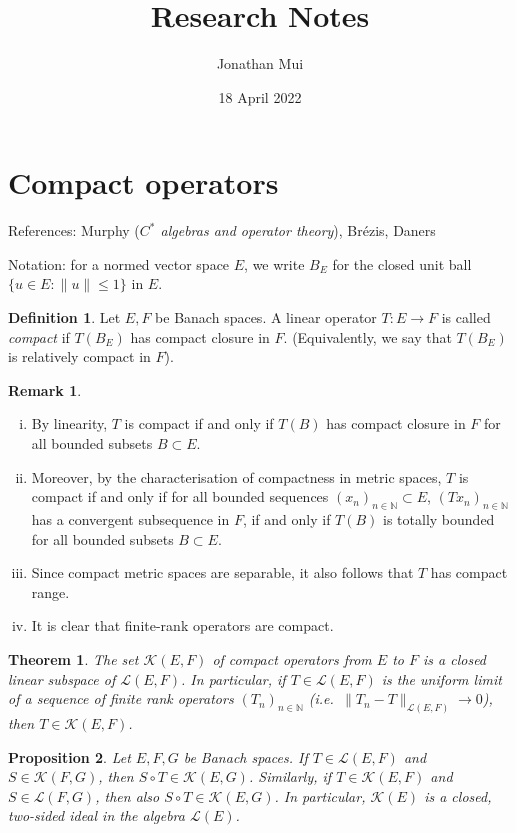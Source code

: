 \documentclass[11pt]{article}
\title{Research Notes}
\author{Jonathan Mui}
\date{18 April 2022}
\numberwithin{equation}{section}
\theoremstyle{plain}
\newtheorem{theorem}{Theorem}[section]
\newtheorem{proposition}[theorem]{Proposition}
\theoremstyle{definition}
\newtheorem{definition}{Definition}[section]
\newtheorem{remark}{Remark}[section]
\newcommand{\NN}{\mathbb{N}}
\begin{document}
	\maketitle
	
	\section{Compact operators}
	References: Murphy (\emph{$C^*$ algebras and operator theory}), Br\'{e}zis, Daners
	
	Notation: for a normed vector space $E$, we write $B_E$ for the closed unit ball $\{u\in E : \|u\| \le 1\}$ in $E$.
	
	\begin{definition}
		Let $E,F$ be Banach spaces. A linear operator $T:E\to F$ is called \emph{compact} if $T(B_E)$ has compact closure in $F$. (Equivalently, we say that $T(B_E)$ is relatively compact in $F$).
	\end{definition}
	
	\begin{remark}
		\begin{enumerate}[(i)]
			\item By linearity, $T$ is compact if and only if $T(B)$ has compact closure in $F$ for all bounded subsets $B\subset E$. 
			\item Moreover, by the characterisation of compactness in metric spaces, $T$ is compact if and only if for all bounded sequences $(x_n)_{n\in\NN} \subset E$, $(Tx_n)_{n\in\NN}$ has a convergent subsequence in $F$, if and only if $T(B)$ is totally bounded for all bounded subsets $B\subset E$.
			\item Since compact metric spaces are separable, it also follows that $T$ has compact range.
			\item It is clear that finite-rank operators are compact.
		\end{enumerate}
	\end{remark}
	
	\begin{theorem}
		The set $\mathcal{K}(E,F)$ of compact operators from $E$ to $F$ is a closed linear subspace of $\mathcal{L}(E,F)$. In particular, if $T\in\mathcal{L}(E,F)$ is the uniform limit of a sequence of finite rank operators $(T_n)_{n\in\NN}$ (i.e.\ $\|T_n-T\|_{\mathcal{L}(E,F)} \to 0$), then $T\in\mathcal{K}(E,F)$.
	\end{theorem}
	
	\begin{proposition}
		Let $E,F,G$ be Banach spaces. If $T\in\mathcal{L}(E,F)$ and $S\in\mathcal{K}(F,G)$, then $S\circ T\in\mathcal{K}(E,G)$. Similarly, if $T\in\mathcal{K}(E,F)$ and $S\in\mathcal{L}(F,G)$, then also $S\circ T\in\mathcal{K}(E,G)$. In particular, $\mathcal{K}(E)$ is a closed, two-sided ideal in the algebra $\mathcal{L}(E)$.
	\end{proposition}
	
\end{document}
